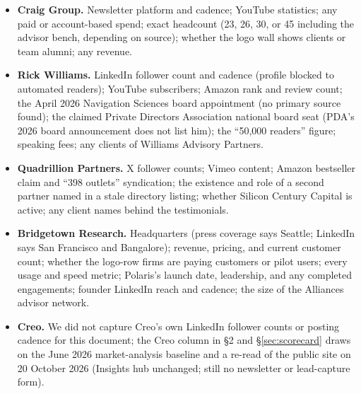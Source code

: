 \documentclass[11pt]{article}
\begin{document}
\begin{itemize}
  \item \textbf{Craig Group.} Newsletter platform and cadence; YouTube statistics; any
  paid or account-based spend; exact headcount (23, 26, 30, or 45 including the advisor
  bench, depending on source); whether the logo wall shows clients or team alumni;
  any revenue.
  \item \textbf{Rick Williams.} LinkedIn follower count and cadence (profile blocked to
  automated readers); YouTube subscribers; Amazon rank and review count; the April
  2026 Navigation Sciences board appointment (no primary source found); the claimed
  Private Directors Association national board seat (PDA's 2026 board announcement
  does not list him); the ``50,000 readers'' figure; speaking fees; any clients of
  Williams Advisory Partners.
  \item \textbf{Quadrillion Partners.} X follower counts; Vimeo content; Amazon
  bestseller claim and ``398 outlets'' syndication; the existence and role of a second
  partner named in a stale directory listing; whether Silicon Century Capital is
  active; any client names behind the testimonials.
  \item \textbf{Bridgetown Research.} Headquarters (press coverage says Seattle;
  LinkedIn says San Francisco and Bangalore); revenue, pricing, and current customer
  count; whether the logo-row firms are paying customers or pilot users; every usage
  and speed metric; Polaris's launch date, leadership, and any completed engagements;
  founder LinkedIn reach and cadence; the size of the Alliances advisor network.
  \item \textbf{Creo.} We did not capture Creo's own LinkedIn follower counts or
  posting cadence for this document; the Creo column in \S2 and \S\ref{sec:scorecard} draws on the June
  2026 market-analysis baseline and a re-read of the public site on 20 October 2026
  (Insights hub unchanged; still no newsletter or lead-capture form).
\end{itemize}

\end{document}
